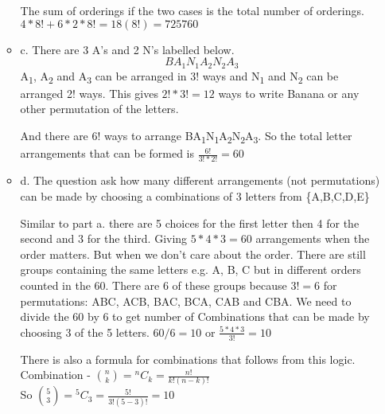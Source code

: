 \documentclass[11pt]{article}
\newcommand*{\Comb}[2]{{}^{#1}C_{#2}}%
\begin{document}
\begin{itemize}
\begin{itemize}
  	The sum of orderings if the two cases is the total number of orderings.
  	$4*8!+6*2*8!=18(8!)=725760$\\

  	\item c.
  	There are 3 A's and 2 N's labelled below.
  	\[ B A_1 N_1 A_2 N_2 A_3\]
  	A\textsubscript{1}, A\textsubscript{2} and A\textsubscript{3} can be arranged in 3! ways
  	and N\textsubscript{1} and N\textsubscript{2} can be arranged 2! ways. This gives $2!*3!=12$ ways to write Banana or any other permutation of the letters.

  	And there are 6! ways to arrange BA\textsubscript{1}N\textsubscript{1}A\textsubscript{2}N\textsubscript{2}A\textsubscript{3}. So the total letter arrangements that can be formed is $\frac{6!}{3!*2!}=60$\\

  	\item d. The question ask how many different arrangements (not permutations) can be made by choosing a combinations of 3 letters from \{A,B,C,D,E\}

  	Similar to part a. there are 5 choices for the first letter then 4 for the second and 3 for the third. Giving $5*4*3=60$ arrangements when the order matters. But when we don't care about the order. There are still groups containing the same letters e.g. A, B, C  but in different orders counted in the 60. There
are 6 of these groups because $3!=6$ for permutations: ABC, ACB, BAC, BCA, CAB and CBA.
We need to divide the 60 by 6 to get number of Combinations that can be made by choosing 3 of the 5 letters. $60/6=10$ or $\frac{5*4*3}{3!}=10$


	There is also a formula for combinations that follows from this logic.\\
  	Combination - $\binom nk=\Comb{n}{k}=\frac{n!}{k!(n-k)!}$\\
  	So $\binom 53=\Comb{5}{3}=\frac{5!}{3!(5-3)!}=10$\\
  \end{itemize}
  \newpage


\end{itemize}
\end{document}
